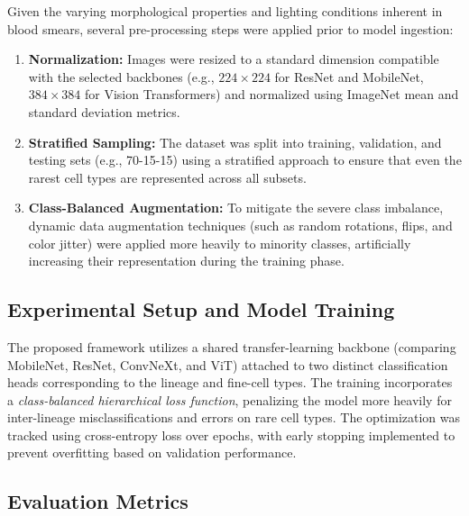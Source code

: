 \documentclass[11pt,a4paper]{article}
\begin{document}
Given the varying morphological properties and lighting conditions inherent in blood smears, several pre-processing steps were applied prior to model ingestion:
\begin{enumerate}
    \item \textbf{Normalization:} Images were resized to a standard dimension compatible with the selected backbones (e.g., $224 \times 224$ for ResNet and MobileNet, $384 \times 384$ for Vision Transformers) and normalized using ImageNet mean and standard deviation metrics.
    \item \textbf{Stratified Sampling:} The dataset was split into training, validation, and testing sets (e.g., 70-15-15) using a stratified approach to ensure that even the rarest cell types are represented across all subsets.
    \item \textbf{Class-Balanced Augmentation:} To mitigate the severe class imbalance, dynamic data augmentation techniques (such as random rotations, flips, and color jitter) were applied more heavily to minority classes, artificially increasing their representation during the training phase.
\end{enumerate}

\subsection{Experimental Setup and Model Training}

The proposed framework utilizes a shared transfer-learning backbone (comparing MobileNet, ResNet, ConvNeXt, and ViT) attached to two distinct classification heads corresponding to the lineage and fine-cell types. 
The training incorporates a \textit{class-balanced hierarchical loss function}, penalizing the model more heavily for inter-lineage misclassifications and errors on rare cell types. The optimization was tracked using cross-entropy loss over epochs, with early stopping implemented to prevent overfitting based on validation performance.

\subsection{Evaluation Metrics}
\end{document}
